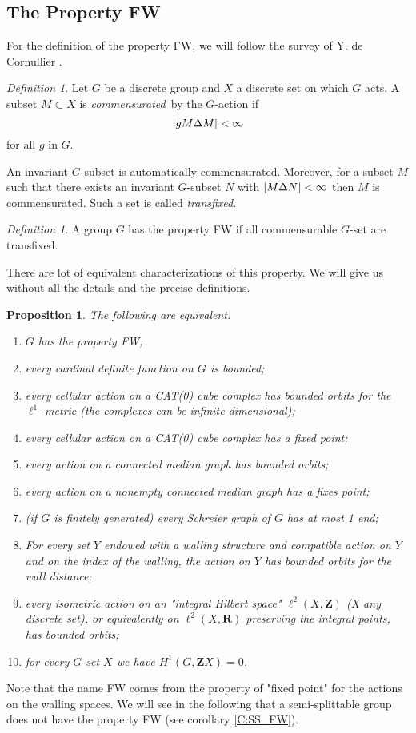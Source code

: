 \documentclass[a4paper]{article}
\newtheorem{prop}[lem]{Proposition}
\theoremstyle{remark}%
\newtheorem{defn}[lem]{Definition}
\DeclarePairedDelimiter\abs{\lvert}{\rvert}
\newcommand*{\field}[1]{\mathbf{#1}}
\newcommand*{\Z}{\field{Z}}
\newcommand*{\R}{\field{R}}
\begin{document}
\subsection{The Property FW}
%
For the definition of the property FW, we will follow the survey of Y. de Cornullier \cite{Cornulier2013}.
%
\begin{defn}
Let $G$ be a discrete group and $X$ a discrete set on which $G$ acts. A subset $M \subset X$ is \emph{commensurated} by the $G$-action if 
\begin{equation*}
\abs{gM \Delta M} < \infty 
\end{equation*}
for all $g$ in $G$.
\end{defn}
An invariant $G$-subset is automatically  commensurated. Moreover, for a subset $M$ such that there exists an invariant $G$-subset $N$ with $\abs{M \Delta N}< \infty$ then $M$ is commensurated. 
Such a set is called \emph{transfixed}.
%
%
\begin{defn}
A group $G$ has the property FW if all commensurable $G$-set are transfixed.
\end{defn}
There are lot of equivalent characterizations of this property. We will give us without all the details and the precise definitions.
%
%
\begin{prop}\label{P:charact_FW}
The following are equivalent:
\begin{enumerate}
\item\label{C:FW_def} $G$ has the property FW;
\item every cardinal definite function on $G$ is bounded;
\item\label{C:FW_Cat(0)} every cellular action on a CAT(0) cube complex has bounded orbits for the $\ell^1$-metric (the complexes can be infinite dimensional);
\item every cellular action on a CAT(0) cube complex has a fixed point;
\item \label{C_FW_MedianGRaph}every action on a connected median graph has bounded orbits;
\item every action on a nonempty connected median graph has a fixes point;
\item \label{C:FW_Schrei} (if $G$ is finitely generated) every Schreier graph of $G$ has at most 1 end;
\item \label{C:FW_Wallings}For every set $Y$ endowed with a walling structure and compatible action on $Y$ and on the index of the walling, the action on $Y$ has bounded orbits for the wall distance;
\item \label{C:FW_Hilbert} every isometric action on an "integral Hilbert space" $\ell^2(X,\Z)$ (X any discrete set), or equivalently on $\ell^2(X,\R)$ preserving the integral points, has bounded orbits;
\item for every $G$-set $X$ we have $H^1(G,\Z X)=0$.
\end{enumerate}
\end{prop}
Note that the name FW comes from the property of "fixed point" for the actions on the walling spaces. We will see in the following that a semi-splittable group does not have the property FW (see corollary \ref{C:SS_FW}).
%
\end{document}
